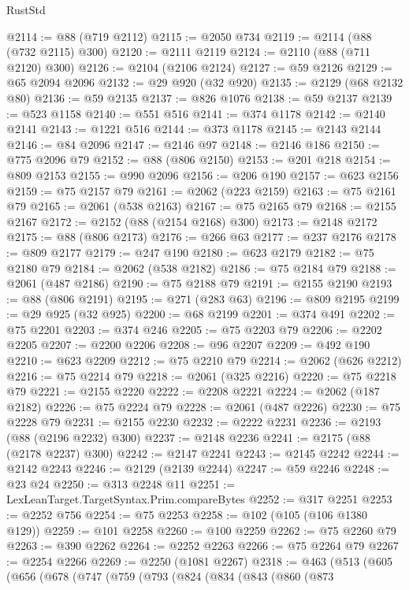 \begin{lexlean}{RustStd}
\begin{coremodule}
@2114 := @88 (@719 @2112)
@2115 := @2050 @734
@2119 := @2114 (@88 (@732 @2115) @300)
@2120 := @2111 @2119
@2124 := @2110 (@88 (@711 @2120) @300)
@2126 := @2104 (@2106 @2124)
@2127 := @59 @2126
@2129 := @65 @2094 @2096
@2132 := @29 @920 (@32 @920)
@2135 := @2129 (@68 @2132 @80)
@2136 := @59 @2135
@2137 := @826 @1076
@2138 := @59 @2137
@2139 := @523 @1158
@2140 := @551 @516
@2141 := @374 @1178
@2142 := @2140 @2141
@2143 := @1221 @516
@2144 := @373 @1178
@2145 := @2143 @2144
@2146 := @84 @2096
@2147 := @2146 @97
@2148 := @2146 @186
@2150 := @775 @2096 @79
@2152 := @88 (@806 @2150)
@2153 := @201 @218
@2154 := @809 @2153
@2155 := @990 @2096
@2156 := @206 @190
@2157 := @623 @2156
@2159 := @75 @2157 @79
@2161 := @2062 (@223 @2159)
@2163 := @75 @2161 @79
@2165 := @2061 (@538 @2163)
@2167 := @75 @2165 @79
@2168 := @2155 @2167
@2172 := @2152 (@88 (@2154 @2168) @300)
@2173 := @2148 @2172
@2175 := @88 (@806 @2173)
@2176 := @266 @63
@2177 := @237 @2176
@2178 := @809 @2177
@2179 := @247 @190
@2180 := @623 @2179
@2182 := @75 @2180 @79
@2184 := @2062 (@538 @2182)
@2186 := @75 @2184 @79
@2188 := @2061 (@487 @2186)
@2190 := @75 @2188 @79
@2191 := @2155 @2190
@2193 := @88 (@806 @2191)
@2195 := @271 (@283 @63)
@2196 := @809 @2195
@2199 := @29 @925 (@32 @925)
@2200 := @68 @2199
@2201 := @374 @491
@2202 := @75 @2201
@2203 := @374 @246
@2205 := @75 @2203 @79
@2206 := @2202 @2205
@2207 := @2200 @2206
@2208 := @96 @2207
@2209 := @492 @190
@2210 := @623 @2209
@2212 := @75 @2210 @79
@2214 := @2062 (@626 @2212)
@2216 := @75 @2214 @79
@2218 := @2061 (@325 @2216)
@2220 := @75 @2218 @79
@2221 := @2155 @2220
@2222 := @2208 @2221
@2224 := @2062 (@187 @2182)
@2226 := @75 @2224 @79
@2228 := @2061 (@487 @2226)
@2230 := @75 @2228 @79
@2231 := @2155 @2230
@2232 := @2222 @2231
@2236 := @2193 (@88 (@2196 @2232) @300)
@2237 := @2148 @2236
@2241 := @2175 (@88 (@2178 @2237) @300)
@2242 := @2147 @2241
@2243 := @2145 @2242
@2244 := @2142 @2243
@2246 := @2129 (@2139 @2244)
@2247 := @59 @2246
@2248 := @23 @24
@2250 := @313 @2248 @11
@2251 := LexLeanTarget.TargetSyntax.Prim.compareBytes
@2252 := @317 @2251
@2253 := @2252 @756
@2254 := @75 @2253
@2258 := @102 (@105 (@106 @1380 @129))
@2259 := @101 @2258
@2260 := @100 @2259
@2262 := @75 @2260 @79
@2263 := @390 @2262
@2264 := @2252 @2263
@2266 := @75 @2264 @79
@2267 := @2254 @2266
@2269 := @2250 (@1081 @2267)
@2318 := @463
    (@513
      (@605
        (@656
          (@678
            (@747
              (@759
                (@793
                  (@824
                    (@834
                      (@843
                        (@860
                          (@873

\end{coremodule}
\end{lexlean}
